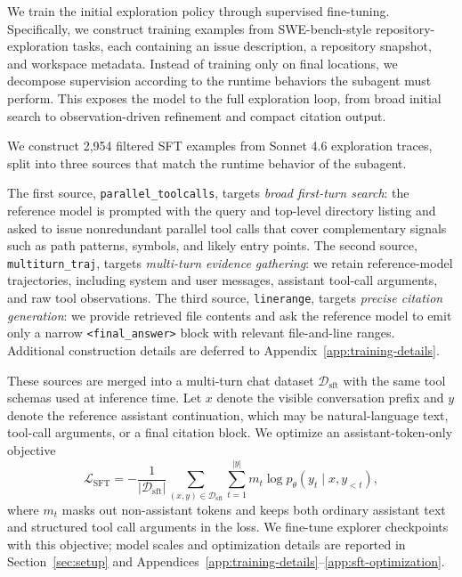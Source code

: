 \documentclass{llmxive}
\begin{document}
We train the initial exploration policy through supervised fine-tuning. 
Specifically, we construct training examples from SWE-bench-style repository-exploration tasks, each containing an issue description, a repository snapshot, and workspace metadata.
Instead of training only on final locations, we decompose supervision according to the runtime behaviors the subagent must perform.
This exposes the model to the full exploration loop, from broad initial search to observation-driven refinement and compact citation output.

We construct 2,954 filtered SFT examples from Sonnet 4.6 exploration traces, split into three sources that match the runtime behavior of the subagent.


The first source, \texttt{parallel\_toolcalls}, targets \emph{broad first-turn search}: the reference model is prompted with the query and top-level directory listing and asked to issue nonredundant parallel tool calls that cover complementary signals such as path patterns, symbols, and likely entry points.
The second source, \texttt{multiturn\_traj}, targets \emph{multi-turn evidence gathering}: we retain reference-model trajectories, including system and user messages, assistant tool-call arguments, and raw tool observations.
The third source, \texttt{linerange}, targets \emph{precise citation generation}: we provide retrieved file contents and ask the reference model to emit only a narrow \texttt{<final\_answer>} block with relevant file-and-line ranges.
Additional construction details are deferred to Appendix~\ref{app:training-details}.

These sources are merged into a multi-turn chat dataset $\mathcal{D}_{\mathrm{sft}}$ with the same tool schemas used at inference time.
Let $x$ denote the visible conversation prefix and $y$ denote the reference assistant continuation, which may be natural-language text, tool-call arguments, or a final citation block.
We optimize an assistant-token-only objective
\begin{equation}
\mathcal{L}_{\mathrm{SFT}}
= -\frac{1}{|\mathcal{D}_{\mathrm{sft}}|}
\sum_{(x,y) \in \mathcal{D}_{\mathrm{sft}}}
\sum_{t=1}^{|y|} m_t \log p_{\theta}(y_t \mid x, y_{<t}),
\end{equation}
where $m_t$ masks out non-assistant tokens and keeps both ordinary assistant text and structured tool call arguments in the loss.
We fine-tune explorer checkpoints with this objective; model scales and optimization details are reported in Section~\ref{sec:setup} and Appendices~\ref{app:training-details}--\ref{app:sft-optimization}.
\end{document}
